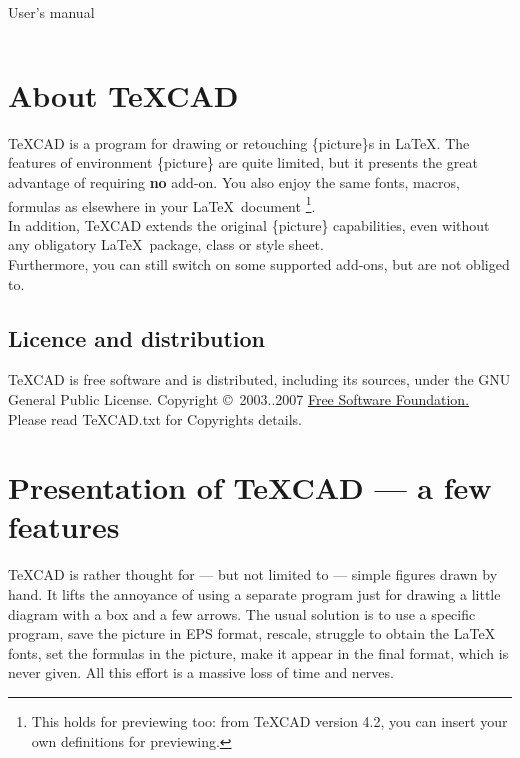 \documentclass[11pt,a4paper]{article}
\begin{document}
%
\parindent 0pt
%
\def\TC{{\TeX}CAD}
%
\begin{center}
% 
{\sf {\Huge \TC} {\LARGE User's manual}}
\end{center}
%
\def\bs{$\backslash$}
\def\hrefid#1{\href{#1}{{\tt {\small #1}}}}
%
$$ $$
%
\section{About {\TC}}
%
  {\TC} is a program for drawing or retouching \{picture\}s in \LaTeX.
  The features of environment \{picture\} are quite limited, but it
  presents the great advantage of requiring {\bf no} add-on.
  You also enjoy the same fonts, macros, formulas as elsewhere
  in your \LaTeX \, document
  \footnote{This holds for previewing too: from {\TC} version 4.2,
  you can insert your own definitions for previewing.}.
  \\
  In addition, {\TC} extends the original \{picture\} capabilities,
  even without any obligatory \LaTeX \, package, class or style sheet.\\
  Furthermore, you can still switch on some supported add-ons, but are not obliged to.\\

%

\subsection{Licence and distribution}
%
    {\TC} is free software and is distributed, including its sources,
    under the GNU General Public License.
    Copyright \copyright \, 2003..2007
    \href{http://www.fsf.org/}{Free Software Foundation.}
    Please read {\TC}.txt for Copyrights details.
%
\section{Presentation of {{\TC}} --- a few features}
%
{{\TC}} is rather thought for --- but
not limited to --- simple figures drawn by hand.
It lifts the annoyance of using a separate program
just for drawing a little diagram with a box and a few arrows.
The usual solution is
to use a specific program, save the picture in EPS format, rescale,
struggle to obtain
the \LaTeX\, fonts, set the formulas in the picture, make it appear
in the final format, which is never given. All this effort is a
massive loss of time and nerves.
\end{document}
